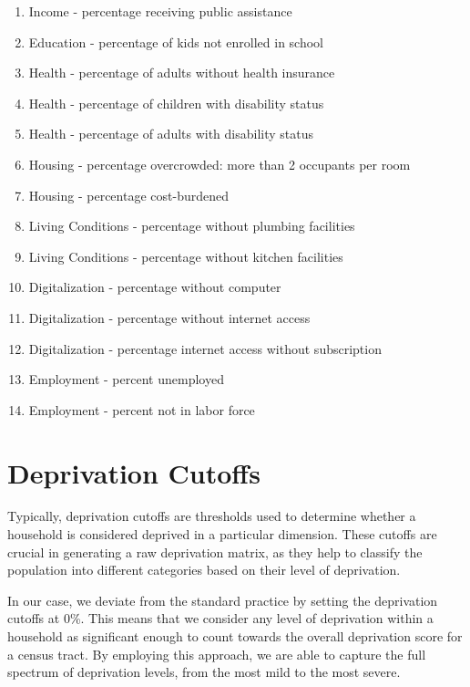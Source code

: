 \documentclass[
  letterpaper,
  DIV=11,
  numbers=noendperiod]{scrreprt}
\begin{document}
\begin{enumerate}
\def\labelenumi{\arabic{enumi}.}
\item
  Income - percentage receiving public assistance
\item
  Education - percentage of kids not enrolled in school
\item
  Health - percentage of adults without health insurance
\item
  Health - percentage of children with disability status
\item
  Health - percentage of adults with disability status
\item
  Housing - percentage overcrowded: more than 2 occupants per room
\item
  Housing - percentage cost-burdened
\item
  Living Conditions - percentage without plumbing facilities
\item
  Living Conditions - percentage without kitchen facilities
\item
  Digitalization - percentage without computer
\item
  Digitalization - percentage without internet access
\item
  Digitalization - percentage internet access without subscription
\item
  Employment - percent unemployed
\item
  Employment - percent not in labor force
\end{enumerate}


\chapter{Deprivation Cutoffs}\label{deprivation-cutoffs}

Typically, deprivation cutoffs are thresholds used to determine whether
a household is considered deprived in a particular dimension. These
cutoffs are crucial in generating a raw deprivation matrix, as they help
to classify the population into different categories based on their
level of deprivation.

In our case, we deviate from the standard practice by setting the
deprivation cutoffs at 0\%. This means that we consider any level of
deprivation within a household as significant enough to count towards
the overall deprivation score for a census tract. By employing this
approach, we are able to capture the full spectrum of deprivation
levels, from the most mild to the most severe.
\end{document}
